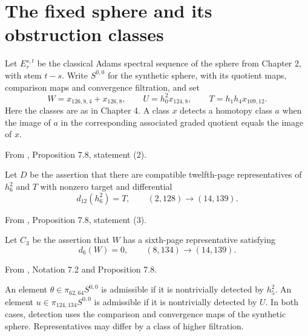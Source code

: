 
\section{The fixed sphere and its obstruction classes}
Let $E_r^{s,t}$ be the classical Adams spectral sequence of the sphere from Chapter 2, with stem $t-s$. Write $S^{0,0}$ for the synthetic sphere, with its quotient maps, comparison maps and convergence filtration, and set
\[
 W=x_{126,8,4}+x_{126,8},\qquad U=h_0^2x_{124,8},\qquad T=h_1h_4x_{109,12}.
\]
Here the classes are as in Chapter 4. A class $x$ detects a homotopy class $a$ when the image of $a$ in the corresponding associated graded quotient equals the image of $x$.

\begin{definition}
\label{sem:Main:last-differential}
From \cite{LWX126}, Proposition 7.8, statement (2).\par
Let $D$ be the assertion that there are compatible twelfth-page representatives of $h_6^2$ and $T$ with nonzero target and differential
\[
 d_{12}(h_6^2)=T,\qquad (2,128)\longrightarrow(14,139).
\]
\end{definition}



\begin{definition}
\label{sem:Main:sixth-differential}
From \cite{LWX126}, Proposition 7.8, statement (3).\par
Let $C_3$ be the assertion that $W$ has a sixth-page representative satisfying
\[
 d_6(W)=0,\qquad (8,134)\longrightarrow(14,139).
\]
\end{definition}

\begin{definition}
\label{sem:Main:admissible-representatives}
From \cite{LWX126}, Notation 7.2 and Proposition 7.8.\par
An element $\theta\in\pi_{62,64}S^{0,0}$ is admissible if it is nontrivially detected by $h_5^2$. An element $u\in\pi_{124,134}S^{0,0}$ is admissible if it is nontrivially detected by $U$. In both cases, detection uses the comparison and convergence maps of the synthetic sphere. Representatives may differ by a class of higher filtration.
\end{definition}

